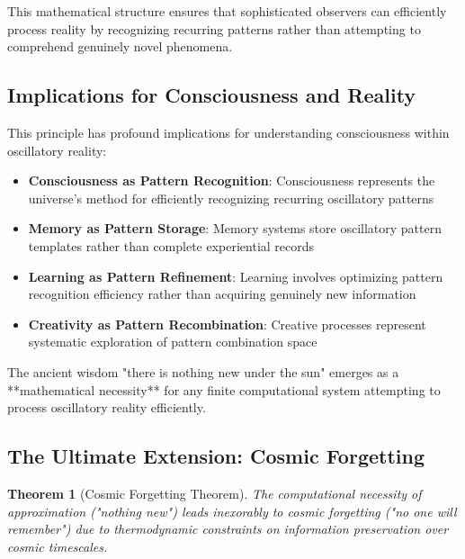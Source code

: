 \documentclass[11pt]{article}
\newtheorem{theorem}{Theorem}[section]
\theoremstyle{remark}
\begin{document}
This mathematical structure ensures that sophisticated observers can efficiently process reality by recognizing recurring patterns rather than attempting to comprehend genuinely novel phenomena.

\subsection{Implications for Consciousness and Reality}

This principle has profound implications for understanding consciousness within oscillatory reality:

\begin{itemize}
\item \textbf{Consciousness as Pattern Recognition}: Consciousness represents the universe's method for efficiently recognizing recurring oscillatory patterns
\item \textbf{Memory as Pattern Storage}: Memory systems store oscillatory pattern templates rather than complete experiential records
\item \textbf{Learning as Pattern Refinement}: Learning involves optimizing pattern recognition efficiency rather than acquiring genuinely new information
\item \textbf{Creativity as Pattern Recombination}: Creative processes represent systematic exploration of pattern combination space
\end{itemize}

The ancient wisdom "there is nothing new under the sun" emerges as a **mathematical necessity** for any finite computational system attempting to process oscillatory reality efficiently.

\subsection{The Ultimate Extension: Cosmic Forgetting}

\begin{theorem}[Cosmic Forgetting Theorem]
The computational necessity of approximation ("nothing new") leads inexorably to cosmic forgetting ("no one will remember") due to thermodynamic constraints on information preservation over cosmic timescales.
\end{theorem}
\end{document}
